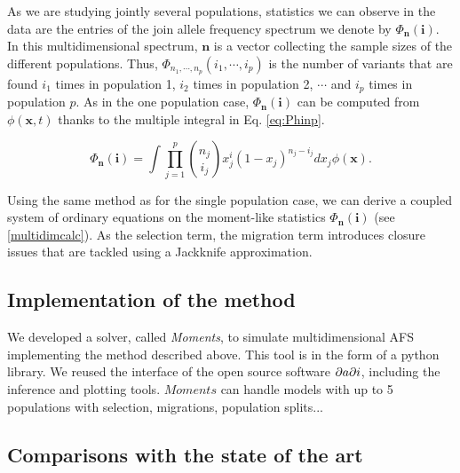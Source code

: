 As we are studying jointly several populations, statistics we can observe in the data are the entries of the join allele frequency spectrum we denote by $\Phi_\textbf{n}(\textbf{i})$. In this multidimensional spectrum, $\textbf{n}$ is a vector collecting the sample sizes of the different populations. Thus, $\Phi_{n_1, \cdots, n_p}(i_1, \cdots, i_p)$ is the number of variants that are found $i_1$ times in population 1, $i_2$ times in population 2, $\cdots$ and $i_p$ times in population $p$. As in the one population case, $\Phi_\textbf{n}(\textbf{i})$ can be computed from $\phi(\textbf{x},t)$ thanks to the multiple integral in Eq. \eqref{eq:Phinp}.

\begin{equation}
\Phi_{\mathbf{n}}(\mathbf{i})= \int \prod_{j=1}^p { n_j \choose i_j} x_j^i (1-x_j)^{n_j-i_j} dx_j \phi(\mathbf{x}).
\label{eq:Phinp}
\end{equation}

Using the same method as for the single population case, we can derive a coupled system of ordinary equations on the moment-like statistics $\Phi_{\mathbf{n}}(\mathbf{i})$ (see \ref{multidimcalc}). As the selection term, the migration term introduces closure issues that are tackled using a Jackknife approximation.

\subsection{Implementation of the method}
We developed a solver, called \textit{Moments}, to simulate multidimensional AFS implementing the method described above. This tool is in the form of a python library. We reused the interface of the open source software $\partial a \partial i$, including the inference and plotting tools. $Moments$ can handle models with up to 5 populations with selection, migrations, population splits...

\subsection{Comparisons with the state of the art}
